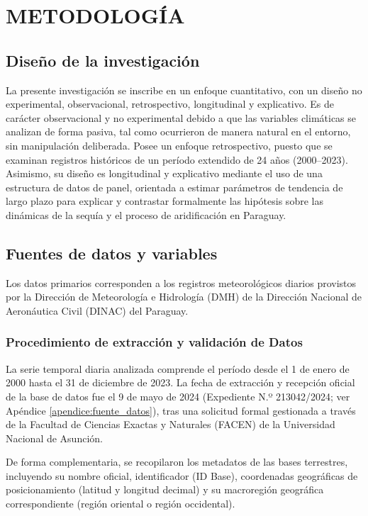 \chapter{METODOLOGÍA}

\section{Diseño de la investigación}

La presente investigación se inscribe en un enfoque cuantitativo, con un diseño no experimental, observacional, retrospectivo, longitudinal y explicativo. Es de carácter observacional y no experimental debido a que las variables climáticas se analizan de forma pasiva, tal como ocurrieron de manera natural en el entorno, sin manipulación deliberada. Posee un enfoque retrospectivo, puesto que se examinan registros históricos de un período extendido de 24 años (2000--2023). Asimismo, su diseño es longitudinal y explicativo mediante el uso de una estructura de datos de panel, orientada a estimar parámetros de tendencia de largo plazo para explicar y contrastar formalmente las hipótesis sobre las dinámicas de la sequía y el proceso de aridificación en Paraguay.

\section{Fuentes de datos y variables}

Los datos primarios corresponden a los registros meteorológicos diarios provistos por la Dirección de Meteorología e Hidrología (DMH) de la Dirección Nacional de Aeronáutica Civil (DINAC) del Paraguay. 

\subsection{Procedimiento de extracción y validación de Datos}

La serie temporal diaria analizada comprende el período desde el 1 de enero de 2000 hasta el 31 de diciembre de 2023. La fecha de extracción y recepción oficial de la base de datos fue el 9 de mayo de 2024 (Expediente N.º 213042/2024; ver Apéndice \ref{apendice:fuente_datos}), tras una solicitud formal gestionada a través de la Facultad de Ciencias Exactas y Naturales (FACEN) de la Universidad Nacional de Asunción.

De forma complementaria, se recopilaron los metadatos de las bases terrestres, incluyendo su nombre oficial, identificador (ID Base), coordenadas geográficas de posicionamiento (latitud y longitud decimal) y su macroregión geográfica correspondiente (región oriental o región occidental).


